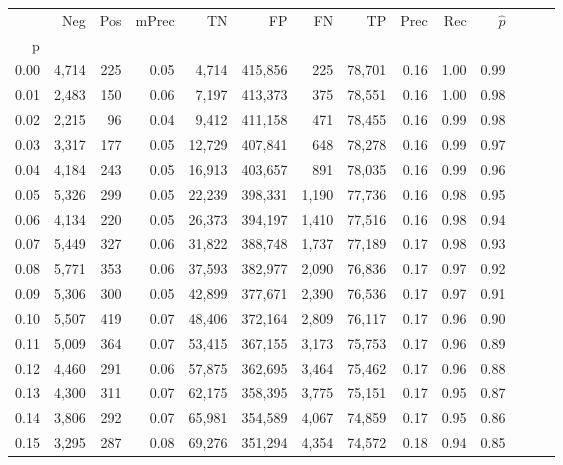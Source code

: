 \begin{tabular}{rrrrrrrrrrrrrr}
\toprule
{} &    Neg &    Pos & mPrec &       TN &       FP &      FN &      TP &  Prec &   Rec & $\hat{p}$ \\
p    &        &        &       &          &          &         &         &       &       &           \\
\midrule
0.00 &  4,714 &    225 &  0.05 &    4,714 &  415,856 &     225 &  78,701 &  0.16 &  1.00 &      0.99 \\
0.01 &  2,483 &    150 &  0.06 &    7,197 &  413,373 &     375 &  78,551 &  0.16 &  1.00 &      0.98 \\
0.02 &  2,215 &     96 &  0.04 &    9,412 &  411,158 &     471 &  78,455 &  0.16 &  0.99 &      0.98 \\
0.03 &  3,317 &    177 &  0.05 &   12,729 &  407,841 &     648 &  78,278 &  0.16 &  0.99 &      0.97 \\
0.04 &  4,184 &    243 &  0.05 &   16,913 &  403,657 &     891 &  78,035 &  0.16 &  0.99 &      0.96 \\
0.05 &  5,326 &    299 &  0.05 &   22,239 &  398,331 &   1,190 &  77,736 &  0.16 &  0.98 &      0.95 \\
0.06 &  4,134 &    220 &  0.05 &   26,373 &  394,197 &   1,410 &  77,516 &  0.16 &  0.98 &      0.94 \\
0.07 &  5,449 &    327 &  0.06 &   31,822 &  388,748 &   1,737 &  77,189 &  0.17 &  0.98 &      0.93 \\
0.08 &  5,771 &    353 &  0.06 &   37,593 &  382,977 &   2,090 &  76,836 &  0.17 &  0.97 &      0.92 \\
0.09 &  5,306 &    300 &  0.05 &   42,899 &  377,671 &   2,390 &  76,536 &  0.17 &  0.97 &      0.91 \\
0.10 &  5,507 &    419 &  0.07 &   48,406 &  372,164 &   2,809 &  76,117 &  0.17 &  0.96 &      0.90 \\
0.11 &  5,009 &    364 &  0.07 &   53,415 &  367,155 &   3,173 &  75,753 &  0.17 &  0.96 &      0.89 \\
0.12 &  4,460 &    291 &  0.06 &   57,875 &  362,695 &   3,464 &  75,462 &  0.17 &  0.96 &      0.88 \\
0.13 &  4,300 &    311 &  0.07 &   62,175 &  358,395 &   3,775 &  75,151 &  0.17 &  0.95 &      0.87 \\
0.14 &  3,806 &    292 &  0.07 &   65,981 &  354,589 &   4,067 &  74,859 &  0.17 &  0.95 &      0.86 \\
0.15 &  3,295 &    287 &  0.08 &   69,276 &  351,294 &   4,354 &  74,572 &  0.18 &  0.94 &      0.85 \\

\end{tabular}
